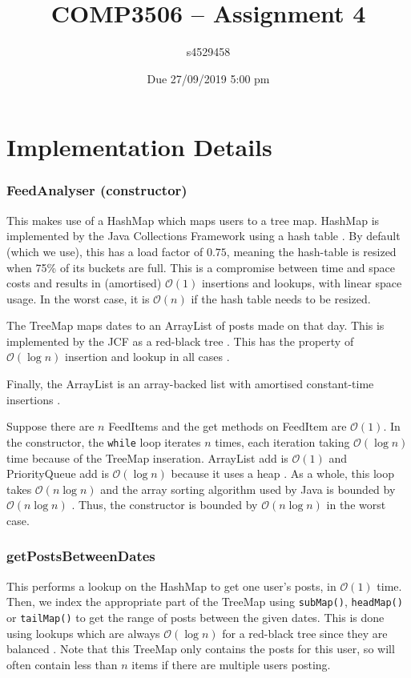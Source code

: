 \documentclass[11pt,a4paper]{article} %
\author{s4529458}
\date{{Due 27/09/2019 5:00 pm}}
\title{COMP3506 -- Assignment 4}
\begin{document}
%

\setcounter{page}{1}
\maketitle

\part*{Implementation Details}
\section*{FeedAnalyser (constructor)}
This makes use of a HashMap which maps users to a tree map.
HashMap is implemented by the Java Collections Framework using a
hash table \cite{hashmap}. By default (which we use), this has a load factor of $0.75$,
meaning the hash-table is resized when 75\% of its buckets are full.
This is a compromise between time and space costs and results in 
(amortised) $\mathcal O(1)$ insertions and lookups, with linear space usage.
In the worst case, it is $\mathcal O(n)$ if the hash table needs to be 
resized.

The TreeMap maps dates to an ArrayList of posts made on that day.
This is implemented by the JCF as a red-black tree \cite{treemap}. 
This has the property of 
$\mathcal O(\log n)$ insertion and lookup in all cases \cite{clrs}.

Finally, the ArrayList is an array-backed 
list with amortised constant-time insertions \cite{arraylist}.

Suppose there are $n$ FeedItems and the get methods on FeedItem are $\mathcal O(1)$.
In the constructor, the \verb|while| loop iterates $n$ times, 
each iteration taking $\mathcal O(\log n)$ time because of the 
TreeMap inseration. 
ArrayList add is $\mathcal O(1)$ and PriorityQueue add is $\mathcal O(\log n)$ 
because it uses a heap \cite{pq}.
As a whole, this loop takes $\mathcal O(n \log n)$ and the array sorting algorithm used by 
Java is bounded by $\mathcal O(n \log n)$ \cite{sort}.
Thus, the constructor is bounded by
$\mathcal O(n \log n)$ in the worst case.

\section*{getPostsBetweenDates}
This performs a lookup on the HashMap to get one user's posts, 
in $\mathcal O(1)$ time.
Then, we index the appropriate part of the TreeMap using 
 \verb|subMap()|, \verb|headMap()|
or \verb|tailMap()| to get the range of posts between the given dates. 
This is done using lookups which are always $\mathcal O(\log n)$
for a red-black tree since they are balanced \cite{redblack}. Note that 
this TreeMap only contains the posts for this user, so will often contain 
less than $n$ items if there are multiple users posting.
\end{document}
